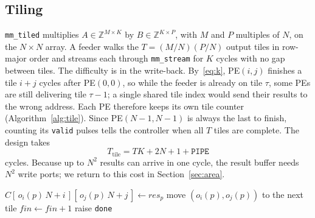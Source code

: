 \documentclass[conference]{IEEEtran}
\newcommand{\code}[1]{\texttt{#1}}
\begin{document}
\subsection{Tiling}
\label{sec:tile}
\code{mm\_tiled} multiplies $A \in \mathbb{Z}^{M\times K}$ by $B \in \mathbb{Z}^{K\times P}$, with $M$ and $P$ multiples of $N$, on the $N\times N$ array. A feeder walks the $T = (M/N)(P/N)$ output tiles in row-major order and streams each through \code{mm\_stream} for $K$ cycles with no gap between tiles. The difficulty is in the write-back. By~\eqref{eq:k}, PE$(i,j)$ finishes a tile $i + j$ cycles after PE$(0,0)$, so while the feeder is already on tile $\tau$, some PEs are still delivering tile $\tau{-}1$; a single shared tile index would send their results to the wrong address. Each PE therefore keeps its own tile counter (Algorithm~\ref{alg:tile}). Since PE$(N{-}1,N{-}1)$ is always the last to finish, counting its \code{valid} pulses tells the controller when all $T$ tiles are complete. The design takes
\begin{equation}
T_{\text{tile}} = TK + 2N + 1 + \mathtt{PIPE}
\label{eq:tile}
\end{equation}
cycles. Because up to $N^2$ results can arrive in one cycle, the result buffer needs $N^2$ write ports; we return to this cost in Section~\ref{sec:area}.

\begin{algorithm}[t]
\caption{Result placement in \code{mm\_tiled}, every cycle}
\label{alg:tile}
\begin{algorithmic}[1]
    \State $C[\,o_i(p)\,N + i\,][\,o_j(p)\,N + j\,] \gets \mathit{res}_p$
    \State move $(o_i(p), o_j(p))$ to the next tile
  \EndIf
\EndFor
{} $\mathit{fin} \gets \mathit{fin} + 1$ \EndIf
{} raise \code{done} \EndIf
\end{algorithmic}
\end{algorithm}
\end{document}
